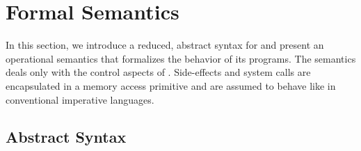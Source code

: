 

\def\JOT{.8\jot}

\section{Formal Semantics}
\label{sec.sem}

In this section, we introduce a reduced, abstract syntax for \CEU and
present an operational semantics that formalizes the behavior of its
programs.
%
The semantics deals only with the control aspects of \CEU.
Side-effects and system calls are encapsulated in a memory access
primitive and are assumed to behave like in conventional imperative
languages.


\subsection{Abstract Syntax}
\label{sec.sem.syntax}


